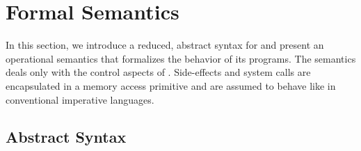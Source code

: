 

\def\JOT{.8\jot}

\section{Formal Semantics}
\label{sec.sem}

In this section, we introduce a reduced, abstract syntax for \CEU and
present an operational semantics that formalizes the behavior of its
programs.
%
The semantics deals only with the control aspects of \CEU.
Side-effects and system calls are encapsulated in a memory access
primitive and are assumed to behave like in conventional imperative
languages.


\subsection{Abstract Syntax}
\label{sec.sem.syntax}


